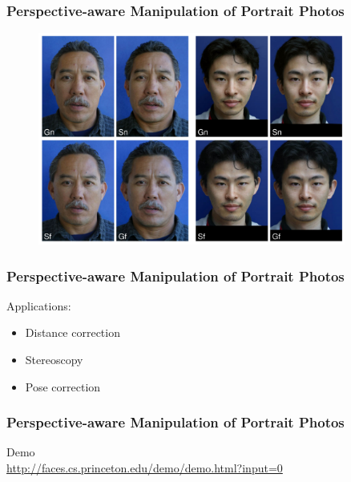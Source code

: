 \frame
{
	\frametitle{Perspective-aware Manipulation of Portrait Photos}
	
	\begin{figure}
		\centering
		\includegraphics[width=0.9\textwidth]{img/perspective/results.png}
	\end{figure}
}

\frame
{
	\frametitle{Perspective-aware Manipulation of Portrait Photos}
	
	Applications:
	\begin{itemize}
		\item Distance correction
		\item Stereoscopy
		\item Pose correction
	\end{itemize}
}

\frame
{
	\frametitle{Perspective-aware Manipulation of Portrait Photos}
	
	\centering
	Demo\\
	\url{http://faces.cs.princeton.edu/demo/demo.html?input=0}
}